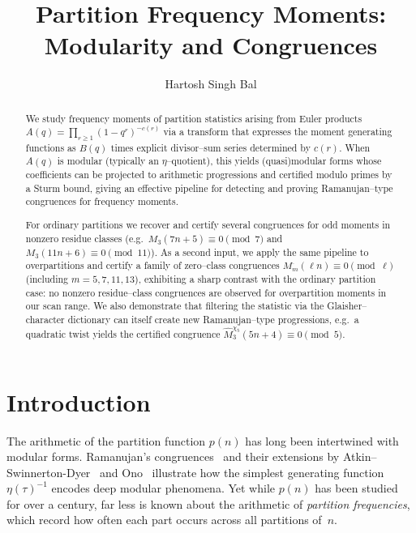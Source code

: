 \documentclass[11pt]{article}
\title{Partition Frequency Moments: Modularity and Congruences}
\author{Hartosh Singh Bal}
\date{}
\theoremstyle{definition}
\theoremstyle{remark}
\begin{document}
\maketitle

\begingroup
\renewcommand\thefootnote{}
\addtocounter{footnote}{-1}
\endgroup

\begin{abstract}
We study frequency moments of partition statistics arising from Euler products
$A(q)=\prod_{r\ge1}(1-q^r)^{-c(r)}$ via a transform that expresses the moment
generating functions as $B(q)$ times explicit divisor--sum series determined by
$c(r)$.  When $A(q)$ is modular (typically an $\eta$--quotient), this yields
(quasi)modular forms whose coefficients can be projected to arithmetic
progressions and certified modulo primes by a Sturm bound, giving an effective
pipeline for detecting and proving Ramanujan--type congruences for frequency
moments.

For ordinary partitions we recover and certify several congruences for odd
moments in nonzero residue classes (e.g.\ $M_3(7n+5)\equiv 0\pmod7$ and
$M_3(11n+6)\equiv 0\pmod{11}$).  As a second input, we apply the same
pipeline to overpartitions and certify a family of zero--class congruences
$M_m^{\overline{\ }}(\ell n)\equiv 0\pmod{\ell}$ (including
$m=5,7,11,13$), exhibiting a sharp contrast with the ordinary partition case:
no nonzero residue--class congruences are observed for overpartition moments in
our scan range. We also demonstrate that filtering the statistic via the Glaisher--character dictionary can itself create new Ramanujan--type progressions, e.g.\ a quadratic twist yields the certified congruence $\widehat{M}^{\chi_5}_3(5n+4)\equiv 0\pmod{5}$.

\end{abstract}


\section{Introduction}

The arithmetic of the partition function $p(n)$ has long been intertwined
with modular forms. Ramanujan’s congruences~\cite{Ramanujan1919} and
their extensions by Atkin--Swinnerton-Dyer~\cite{AtkinSwinnertonDyer1954}
and Ono~\cite{Ono2000,Ono2004} illustrate how the simplest generating
function $\eta(\tau)^{-1}$ encodes deep modular phenomena. Yet while
$p(n)$ has been studied for over a century, far less is known about the
arithmetic of \emph{partition frequencies}, which record how often each
part occurs across all partitions of~$n$.
\end{document}
